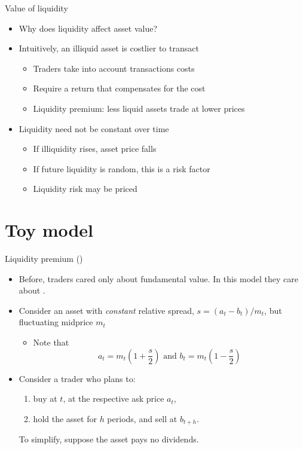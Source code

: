 \documentclass[english,10pt
,aspectratio=169
]{beamer}
\begin{document}
\begin{frame}{Value of liquidity}
	\begin{itemize}
		\item Why does liquidity affect asset value?
		\item Intuitively, an illiquid asset is costlier to transact
		\begin{itemize}
			\item Traders take into account transactions costs
			\item Require a return that compensates for the cost
			\item Liquidity premium: less liquid assets trade at lower prices
		\end{itemize}
		\item Liquidity need not be constant over time
		\begin{itemize}
			\item If illiquidity rises, asset price falls
			\item If future liquidity is random, this is a risk factor
			\item Liquidity risk may be priced
		\end{itemize}
	\end{itemize}
\end{frame}



\section{Toy model}

\begin{frame}{Liquidity premium (\cite{amihud_asset_1986})}
	\begin{itemize}
		\item Before, traders cared only about fundamental value. In this model they care about .
		\item Consider an asset with \emph{constant} relative spread, $s=(a_t-b_t)/m_t$, but fluctuating midprice $m_t$
		\begin{itemize}
			\item Note that
			\[
			a_t=m_t \left(1+\frac{s}{2}\right) \text{ and } b_t=m_t\left(1-\frac{s}{2}\right)
			\]
		\end{itemize}
		\item Consider a trader who plans to:
		\begin{enumerate}
			\item buy at $t$, at the respective ask price $a_t$,
			\item hold the asset for $h$ periods, and sell at $b_{t+h}$.
		\end{enumerate}
		To simplify, suppose the asset pays no dividends.
	\end{itemize}
\end{frame}
\end{document}
